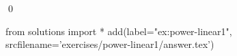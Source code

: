 
\begin{ex} 
  \label{ex:power-linear1}
  
  \qed
\end{ex} 
\begin{python0}
from solutions import *
add(label="ex:power-linear1",
    srcfilename='exercises/power-linear1/answer.tex') 
\end{python0}
